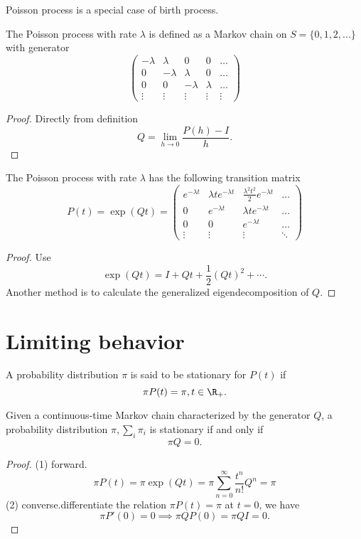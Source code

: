 \begin{refsection}
\begin{remark}
Poisson process is a special case of birth process.	
\end{remark}

\begin{lemma}
	The Poisson process with rate $\lambda$ is defined as a Markov chain on $S=\{0,1,2,...\}$ with generator
	$$\begin{pmatrix}
	-\lambda & \lambda & 0 & 0 & \dots\\ 
	0 & -\lambda & \lambda & 0 & \dots\\ 
	0 & 0 & -\lambda & \lambda & \dots\\ 
	\vdots & \vdots & \vdots & \vdots & \vdots 
	\end{pmatrix}$$
\end{lemma}
\begin{proof}
	Directly from definition $$Q = \lim_{h\to 0}\frac{P(h) - I}{h}.$$
\end{proof}

\begin{lemma}
The Poisson process with rate $\lambda$ has the following transition matrix
$$P(t) = \exp(Qt) = \begin{pmatrix}
e^{-\lambda t} & \lambda te^{-\lambda t} & \frac{\lambda^2t^2}{2}e^{-\lambda t} & \dots\\ 
0 & e^{-\lambda t} & \lambda te^{-\lambda t} & \dots \\ 
0 & 0 & e^{-\lambda t} & \dots \\ 
\vdots & \vdots & \vdots & \ddots
\end{pmatrix}$$	
\end{lemma}
\begin{proof}
Use
$$\exp(Qt) = I + Qt + \frac{1}{2}(Qt)^2 + \cdots.$$
Another method is to calculate the generalized eigendecomposition of $Q$.
\end{proof}

\section{Limiting behavior}
\begin{definition}\cite[191]{privault2013understanding}
A probability distribution $\pi$ is said to be stationary for $P(t)$ if
$$\pi P(t) = \pi,t\in \R_+.$$
\end{definition}

\begin{theorem}
Given a continuous-time Markov chain characterized by the generator $Q$, a probability distribution $\pi,\sum_i \pi_i$ is stationary if and only if
	$$\pi Q = 0.$$
\end{theorem}
\begin{proof}
(1) forward.
$$\pi P(t) = \pi \exp(Qt) = \pi \sum_{n=0}^\infty \frac{t^n}{n!}Q^n = \pi$$
(2) converse.differentiate the relation $\pi P(t)=\pi $ at $t = 0$, we have
$$\pi P'(0) = 0 \implies \pi QP(0) = \pi Q I = 0.$$
\end{proof}


\end{refsection}
